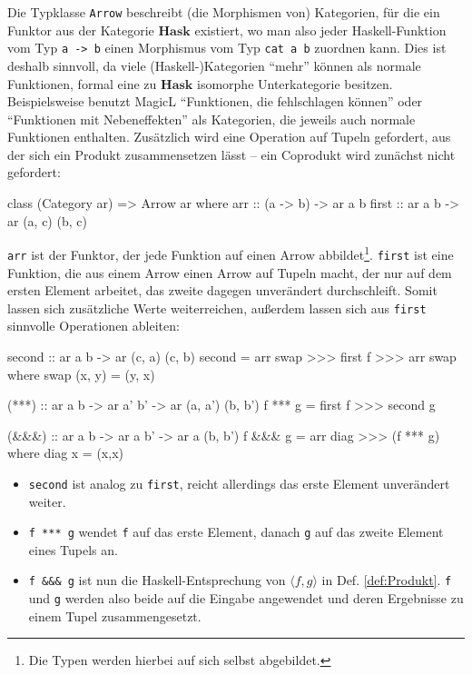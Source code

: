 \documentclass[12pt, a4paper, bibgerm]{scrbook}
\newenvironment{DIFnomarkup}{}{}
\newcommand\icode[1]{\lstinline?#1?}
\newcommand{\dref}[1]{Def. \ref{def:#1}}
\begin{document}
Die Typklasse \icode{Arrow} beschreibt (die Morphismen von) Kategorien,
für die ein Funktor aus der Kategorie $\mathbf{Hask}$ existiert, wo man
also jeder Haskell-Funktion vom Typ \icode{a -> b} einen Morphismus vom
Typ \icode{cat a b} zuordnen kann. Dies ist deshalb sinnvoll, da viele
(Haskell-)Kategorien "`mehr"' können als normale Funktionen, formal eine zu
$\mathbf{Hask}$ isomorphe Unterkategorie besitzen. Beispielsweise
benutzt MagicL "`Funktionen, die fehlschlagen können"' oder "`Funktionen
mit Nebeneffekten"' als Kategorien, die jeweils auch normale Funktionen
enthalten. Zusätzlich wird eine Operation auf Tupeln gefordert, aus der
sich ein Produkt zusammensetzen lässt -- ein Coprodukt wird zunächst nicht gefordert:
\begin{DIFnomarkup}\begin{code}
class (Category ar) => Arrow ar where
  arr   :: (a -> b) -> ar a b
  first :: ar a b  -> ar (a, c) (b, c)
\end{code}\end{DIFnomarkup}
\icode{arr} ist der Funktor, der jede Funktion auf einen Arrow
abbildet\footnote{Die Typen werden hierbei auf sich selbst abgebildet.}.
\icode{first} ist eine Funktion, die aus einem Arrow einen Arrow auf
Tupeln macht, der nur auf dem ersten Element arbeitet, das zweite
dagegen unverändert durchschleift. Somit lassen sich zusätzliche Werte
weiterreichen, außerdem lassen sich aus \icode{first} sinnvolle
Operationen ableiten:

\begin{DIFnomarkup}\begin{code}
  second :: ar a b -> ar (c, a) (c, b)
  second = arr swap >>> first f >>> arr swap
    where swap (x, y) = (y, x)

  (***) :: ar a b -> ar a' b' -> ar (a, a') (b, b')
  f *** g = first f >>> second g

  (&&&) :: ar a b -> ar a b' -> ar a (b, b')
  f &&& g = arr diag >>> (f *** g)
    where diag x = (x,x)
\end{code}\end{DIFnomarkup} %

\begin{itemize}
\item \icode{second} ist analog zu \icode{first}, reicht allerdings das erste
Element unverändert weiter.
\item \icode{f *** g} wendet \icode{f} auf das
erste Element, danach \icode{g} auf das zweite Element eines Tupels
an.
\item \icode{f &&& g} ist nun die Haskell-Entsprechung von $\langle f,g
\rangle$ in \dref{Produkt}. \icode{f} und \icode{g} werden also beide
auf die Eingabe angewendet und deren Ergebnisse zu einem Tupel
zusammengesetzt.
\end{itemize}
\end{document}
